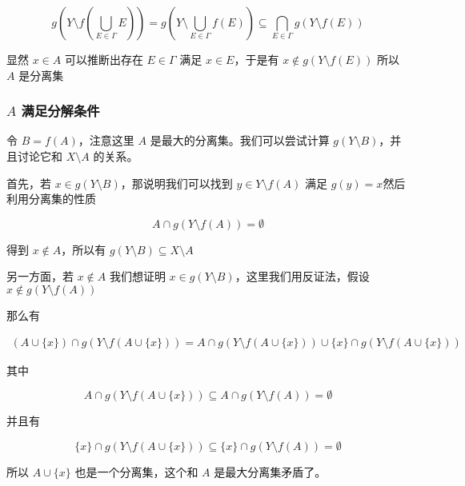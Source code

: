 \documentclass[12pt,a4paper]{ctexart}
\begin{document}
\[
g(Y \setminus f(\bigcup_{E \in \Gamma}E)) = g(Y \setminus \bigcup_{E \in \Gamma}f(E)) \subseteq \bigcap_{E \in \Gamma} g(Y \setminus f(E))
\]

显然 $x \in A$ 可以推断出存在 $E \in \Gamma$ 满足 $x \in E$，于是有 $x \notin g(Y \setminus f(E))$ 
所以 $A$ 是分离集

\subsubsection{$A$ 满足分解条件}

令 $B = f(A)$，注意这里 $A$ 是最大的分离集。我们可以尝试计算 $ g(Y \setminus B)$，并且讨论它和 $X \setminus A$ 的关系。

首先，若 $x \in  g(Y \setminus B)$，那说明我们可以找到 $y \in Y \setminus f(A)$ 满足 $g(y) = x$然后利用分离集的性质

\[
A \cap g(Y \setminus f(A)) = \emptyset
\]

得到 $x \notin A$，所以有 $g(Y \setminus B) \subseteq X \setminus A$


另一方面，若 $x \notin A$ 我们想证明 $x \in g(Y \setminus B)$，这里我们用反证法，假设 $x \notin g(Y \setminus f(A))$

那么有

\begin{align*}
(A \cup \{x\}) \cap g(Y \setminus f(A \cup \{ x \})) =  
A \cap g(Y \setminus f(A \cup \{ x \})) \cup  \{x\} \cap g(Y \setminus f(A \cup \{ x \}))
\end{align*}

其中

\[
A \cap g(Y \setminus f(A \cup \{ x \})) \subseteq A \cap g(Y \setminus f(A)) = \emptyset
\]

并且有

\[
\{x\} \cap g(Y \setminus f(A \cup \{ x \})) \subseteq \{x\} \cap g(Y \setminus f(A)) = \emptyset
\]

所以 $A \cup \{ x \}$ 也是一个分离集，这个和 $A$ 是最大分离集矛盾了。
\end{document}
